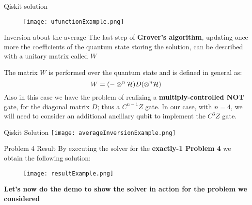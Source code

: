 		\begin{frame}{Qiskit solution}
			\begin{figure}
				\vspace{-1cm}
				\centering
				\texttt{[image: ufunctionExample.png]}
			\end{figure}
		\end{frame}
	
		\begin{frame}{Inversion about the average}
			The last step of \textbf{Grover's algorithm}, updating once more the coefficients of the quantum state storing the solution, can be described with a unitary matrix called $W$\\
			
			\vspace{0.2cm}
			
			The matrix $W$ is performed over the quantum state and is defined in general as:
			\begin{equation*}
				\centering
				W = (-\otimes^n\mathcal{H})D(\otimes^n\mathcal{H})
			\end{equation*}
			Also in this case we have the problem of realizing a \textbf{multiply-controlled NOT} gate, for the diagonal matrix $D$; thus a $C^{n-1}Z$ gate. In our case, with $n=4$, we will need to consider an additional ancillary qubit to implement the $C^3Z$ gate.
		\end{frame}
	
		\begin{frame}{Qiskit Solution}
			\vspace{-0.8cm}
			\centering
			\texttt{[image: averageInversionExample.png]}
		\end{frame}
	
		\begin{frame}{Problem 4 Result}
			By executing the solver for the \textbf{exactly-1 Problem 4} we obtain the following solution:
			\begin{figure}[h]
				\vspace{-0.2cm}
				\centering
				\texttt{[image: resultExample.png]}
				\vspace{-0.3cm}
			\end{figure}
			\textbf{Let's now do the demo to show the solver in action for the problem we considered}
		\end{frame}
	

